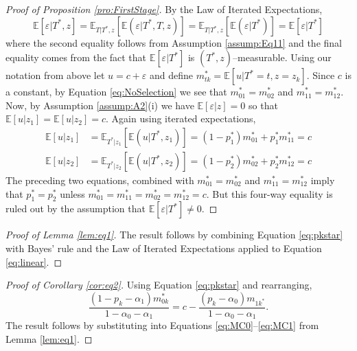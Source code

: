 \begin{proof}[Proof of Proposition \ref{pro:FirstStage}]
  By the Law of Iterated Expectations,
  \begin{equation}
    \label{eq:NoSelection}
    \mathbb{E}[\varepsilon|T^*,z] = \mathbb{E}_{T|T^*,z}\left[\mathbb{E}\left(\varepsilon|T^*,T,z \right)  \right] = \mathbb{E}_{T|T^*,z}\left[\mathbb{E}\left(\varepsilon|T^* \right)  \right]
    = \mathbb{E}\left[ \varepsilon|T^* \right]
  \end{equation}
    where the second equality follows from Assumption \ref{assump:Eq11} and the final equality comes from the fact that $\mathbb{E}[\varepsilon|T^*]$ is $(T^*,z)$--measurable. 
  Using our notation from above let $u = c + \varepsilon$ and define $m^*_{tk}=\mathbb{E}[u|T^*=t,z=z_k]$.
  Since $c$ is a constant, by Equation \ref{eq:NoSelection} we see that $m^*_{01}=m^*_{02}$ and $m^*_{11}=m^*_{12}$.
  Now, by Assumption \ref{assump:A2}(i) we have $\mathbb{E}[\varepsilon|z]=0$ so that $\mathbb{E}[u|z_1]= \mathbb{E}[u|z_2] =c$.
  Again using iterated expectations, 
  \begin{align*}
    \mathbb{E}\left[u|z_1 \right] &= \mathbb{E}_{T^*|z_1}\left[\mathbb{E}\left( u|T^*,z_1 \right)  \right] = (1-p_1^*) m^*_{01} + p^*_1 m^*_{11}=c\\
    \mathbb{E}\left[u|z_2 \right] &= \mathbb{E}_{T^*|z_2}\left[\mathbb{E}\left( u|T^*,z_2 \right)  \right] = (1-p_2^*) m^*_{02} + p^*_2 m^*_{12}=c
  \end{align*}
  The preceding two equations, combined with $m^*_{01}=m^*_{02}$ and $m^*_{11}=m^*_{12}$ imply that $p_1^* = p_2^*$ unless $m^*_{01} = m^*_{11} = m^*_{02} = m^*_{12} = c$.
  But this four-way equality is ruled out by the assumption that $\mathbb{E}[\varepsilon|T^*]\neq0$. 
\end{proof}

\begin{proof}[Proof of Lemma \ref{lem:eq1}]
  The result follows by combining Equation \ref{eq:pkstar} with Bayes' rule and the Law of Iterated Expectations applied to Equation \ref{eq:linear}.
\end{proof}

\begin{proof}[Proof of Corollary \ref{cor:eq2}]
Using Equation \ref{eq:pkstar} and rearranging, 
\begin{equation*}
  \frac{(1 - p_k - \alpha_1) m_{0k}^*}{1 - \alpha_0 - \alpha_1} = c - \frac{(p_k - \alpha_0)m_{1k^*}}{1 - \alpha_0 - \alpha_1}.
\end{equation*}
The result follows by substituting into Equations \ref{eq:MC0}--\ref{eq:MC1} from Lemma \ref{lem:eq1}.
\end{proof}

